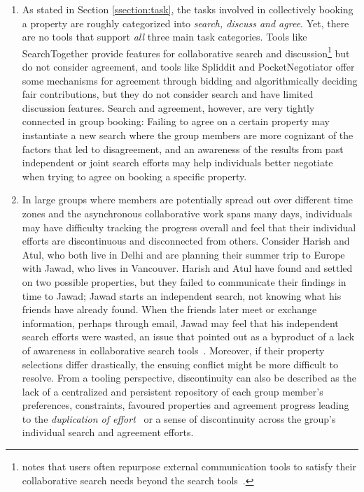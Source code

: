 \begin{enumerate}[label={}, leftmargin=0cm, itemindent=0.2cm]

    \item \cDisconnectedTooling As stated in Section \ref{ssection:task}, the tasks involved in collectively booking a property are roughly categorized into \textit{search, discuss and agree}. Yet, there are no tools that support \textit{all} three main task categories. Tools like SearchTogether \cite{searchtogether} provide features for collaborative search and discussion\footnote{\citeauthor{collaborativesearchrevisted} notes that users often repurpose external communication tools to satisfy their collaborative search needs beyond the search tools~\cite{collaborativesearchrevisted}.} but do not consider agreement, and tools like Spliddit \cite{spliddit} and PocketNegotiator \cite{pocketnegotiator} offer some mechanisms for agreement through bidding and algorithmically deciding fair contributions, but they do not consider search and have limited discussion features. Search and agreement, however, are very tightly connected in group booking: Failing to agree on a certain property may instantiate a new search where the group members are more cognizant of the factors that led to disagreement, and an awareness of the results from past independent or joint search efforts may help individuals better negotiate when trying to agree on booking a specific property. 

    
    \item \cDiscontinuity In large groups where members are potentially spread out over different time zones and the asynchronous collaborative work spans many days, individuals may have difficulty tracking the progress overall and feel that their individual efforts are discontinuous and disconnected from others. Consider Harish and Atul, who both live in Delhi and are planning their summer trip to Europe with Jawad, who lives in Vancouver. Harish and Atul have found and settled on two possible properties, but they failed to communicate their findings in time to Jawad; Jawad starts an independent search, not knowing what his friends have already found. When the friends later meet or exchange information, perhaps through email, Jawad may feel that his independent search efforts were wasted, an issue that \citeauthor{searchtogether} pointed out as a byproduct of a lack of awareness in collaborative search tools~\cite{searchtogether}. Moreover, if their property selections differ drastically, the ensuing conflict might be more difficult to resolve. From a tooling perspective, discontinuity can also be described as the lack of a centralized and persistent repository of each group member's preferences, constraints, favoured properties and agreement progress leading to the \textit{duplication of effort}~\cite{searchtogether} or a sense of discontinuity across the group's individual search and agreement efforts.
    

\end{enumerate}
